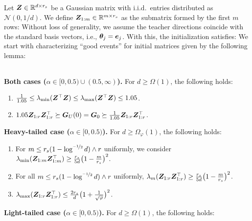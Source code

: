 Let $\boldsymbol{Z} \in \mathbb{R}^{d \times r_s}$ be a Gaussian matrix with i.i.d.\ entries distributed as $\mathcal{N}(0,1/d)$. We define $\boldsymbol{Z}_{1:m}  \in \mathbb{R}^{m \times r_s}$ as the submatrix formed by the first $m$ rows:
Without loss of generality, we assume the teacher directions coincide with the standard basis vectors, i.e., $\boldsymbol{\theta}_j = \boldsymbol{e}_j$. With this, the initialization satisfies:
We start with characterizing ``good events'' for initial matrices given by the following lemma:
\begin{lemma}
\label{lem:goodevents}
\hfill \\[0.6em]
\textbf{Both cases ($\alpha \in [0,0.5) \cup (0.5,\infty)$).}  For $d \geq \Omega(1)$, the following holds:
\begin{enumerate}[label=(E.\arabic*)]
\item   \label{event:Zbound}    $ \tfrac{1}{1.05} \leq \lambda_{\mathrm{min}} (\boldsymbol{Z}^\top \boldsymbol{Z}  ) \leq \lambda_{\mathrm{max}} (  \boldsymbol{Z}^\top \boldsymbol{Z}) \leq 1.05$.
\item   \label{event:Gbound}  $  1.05 \boldsymbol{Z}_{1:r} \boldsymbol{Z}_{1:r}^\top \succeq \boldsymbol{G}_U(0) = \boldsymbol{G}_0 \succeq       \frac{1}{1.05} \boldsymbol{Z}_{1:r} \boldsymbol{Z}_{1:r}^\top$.
\end{enumerate}
\textbf{Heavy-tailed case ($\alpha \in [0,0.5)$).}   For $d \geq \Omega_{\varphi}(1)$, the following holds:
\begin{enumerate}[label=(H.\arabic*)]
\item \label{event:htZlb}  For  $m  \leq  r_s (1 -   \log^{\nicefrac{-1}{2}} d) \wedge r$ uniformly,  we consider $\lambda_{\mathrm{min}} (  \boldsymbol{Z}_{1:m} \boldsymbol{Z}_{1:m}^\top ) \geq  \tfrac{r_s}{5 d} \big( 1 -  \tfrac{m}{r_s}   \big)^2 $.
\item \label{event:htZlbiso}  For all $m  \leq  r_s (1 -   \log^{\nicefrac{-1}{2}} d) \wedge r$ uniformly,  $\lambda_{m}(    \boldsymbol{Z}_{1:r} \boldsymbol{Z}_{1:r}^\top ) \geq  \tfrac{r_s}{5 d} \big( 1 -     \tfrac{m}{r_s}    \big)^2$.
\item \label{event:htZub}    $\lambda_{\mathrm{max}} ( \boldsymbol{Z}_{1:r} \boldsymbol{Z}_{1:r}^\top ) \leq \frac{2r_s}{d} \big(1 + \frac{1}{\sqrt{\varphi}} \big)^2$.
\end{enumerate}
\textbf{Light-tailed case ($\alpha \in [0,0.5)$).}   For $d \geq \Omega(1)$, the following holds:
\begin{enumerate}[label=(L.\arabic*)]

\end{enumerate}
\end{lemma}
